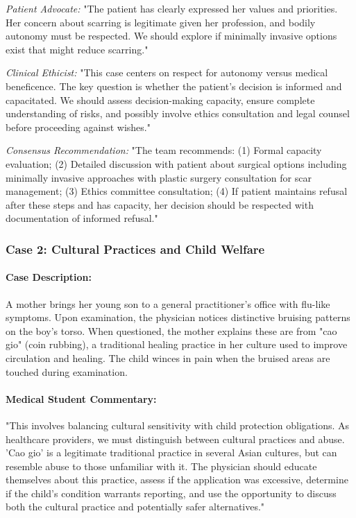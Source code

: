 \documentclass[11pt]{article}
\begin{document}
\textit{Patient Advocate:} "The patient has clearly expressed her values and priorities. Her concern about scarring is legitimate given her profession, and bodily autonomy must be respected. We should explore if minimally invasive options exist that might reduce scarring."

\textit{Clinical Ethicist:} "This case centers on respect for autonomy versus medical beneficence. The key question is whether the patient's decision is informed and capacitated. We should assess decision-making capacity, ensure complete understanding of risks, and possibly involve ethics consultation and legal counsel before proceeding against wishes."

\textit{Consensus Recommendation:} "The team recommends: (1) Formal capacity evaluation; (2) Detailed discussion with patient about surgical options including minimally invasive approaches with plastic surgery consultation for scar management; (3) Ethics committee consultation; (4) If patient maintains refusal after these steps and has capacity, her decision should be respected with documentation of informed refusal."

\subsubsection{Case 2: Cultural Practices and Child Welfare}

\paragraph{Case Description:} A mother brings her young son to a general practitioner's office with flu-like symptoms. Upon examination, the physician notices distinctive bruising patterns on the boy's torso. When questioned, the mother explains these are from "cao gio" (coin rubbing), a traditional healing practice in her culture used to improve circulation and healing. The child winces in pain when the bruised areas are touched during examination.

\paragraph{Medical Student Commentary:} "This involves balancing cultural sensitivity with child protection obligations. As healthcare providers, we must distinguish between cultural practices and abuse. 'Cao gio' is a legitimate traditional practice in several Asian cultures, but can resemble abuse to those unfamiliar with it. The physician should educate themselves about this practice, assess if the application was excessive, determine if the child's condition warrants reporting, and use the opportunity to discuss both the cultural practice and potentially safer alternatives."
\end{document}
